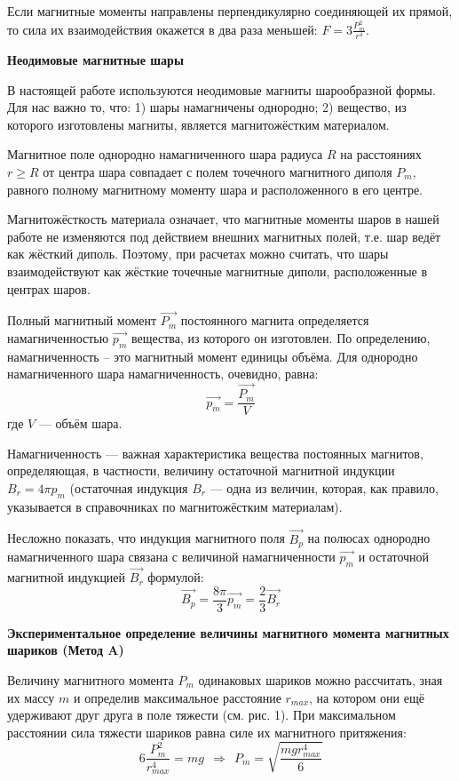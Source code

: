 \documentclass[14pt]{article}
\begin{document}
Если магнитные моменты направлены перпендикулярно соединяющей их прямой, то сила их взаимодействия окажется в два раза меньшей: $F = 3\frac{P_m^2}{r^4}$.

\vspace{1cm}
\textbf{Неодимовые магнитные шары}

В настоящей работе используются неодимовые магниты шарообразной формы. Для нас важно то, что:
1) шары намагничены однородно;
2) вещество, из которого изготовлены магниты, является магнитожёстким материалом.

Магнитное поле однородно намагниченного шара радиуса $R$ на расстояниях $r \geq R$ от центра шара совпадает с полем точечного магнитного диполя $P_m$, равного полному магнитному моменту шара и расположенного в его центре. 

Магнитожёсткость материала означает, что магнитные моменты шаров в нашей работе не изменяются под действием внешних магнитных полей, т.е. шар ведёт как жёсткий диполь. Поэтому, при расчетах можно считать, что шары взаимодействуют как жёсткие точечные магнитные диполи, расположенные в центрах шаров.

Полный магнитный момент $\vec{P_m}$ постоянного магнита определяется намагниченностью $\vec{p_m}$ вещества, из которого он изготовлен. По определению, намагниченность -- это магнитный момент единицы объёма. Для однородно намагниченного шара намагниченность, очевидно, равна:
$$
	\vec{p_m} = \frac{\vec{P_m}}{V}
$$
где $V$ — объём шара.

Намагниченность — важная характеристика вещества постоянных магнитов, определяющая, в частности, величину остаточной магнитной индукции $B_r = 4\pi p_m$ (остаточная индукция $B_r$ — одна из величин, которая, как правило, указывается в справочниках по магнитожёстким материалам).

Несложно показать, что индукция магнитного поля $\vec{B_p}$ на полюсах однородно намагниченного шара связана с величиной намагниченности $\vec{p_m}$ и остаточной магнитной
индукцией $\vec{B_r}$ формулой:
$$
	\vec{B_p} = \frac{8\pi}{3}\vec{p_m} = \frac{2}{3}\vec{B_r}
$$

\vspace{1cm}
\textbf{Экспериментальное определение величины магнитного момента магнитных шариков (Метод A)}

Величину магнитного момента $P_m$ одинаковых шариков можно рассчитать, зная их массу $m$ и определив максимальное расстояние $r_{max}$, на котором они ещё удерживают друг друга в поле тяжести (см. рис. 1). При максимальном расстоянии сила тяжести шариков равна силе их магнитного притяжения:
$$
	6\frac{P_m^2}{r_{max}^4} = mg ~~ \Rightarrow ~~ P_m = \sqrt{\frac{mgr_{max}^4}{6}}
$$
\end{document}
